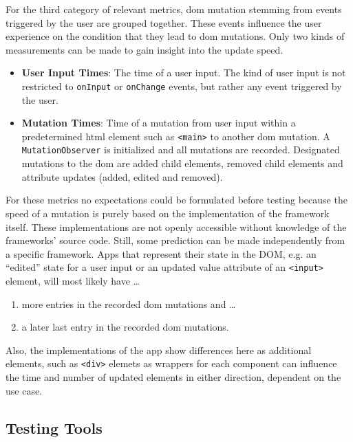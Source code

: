 \documentclass[a4paper, 12pt]{article}
\begin{document}
For the third category of relevant metrics, \acrshort{dom} mutation stemming from events triggered by the user are grouped together.
These events influence the user experience on the condition that they lead to \acrshort{dom} mutations.
Only two kinds of measurements can be made to gain insight into the update speed.

\begin{itemize}
  \item \textbf{User Input Times}: The time of a user input.
  The kind of user input is not restricted to \verb|onInput| or \verb|onChange| events, but rather any event triggered by the user.
  \item \textbf{Mutation Times}: Time of a mutation from user input within a predetermined \acrshort{html} element such as \verb|<main>| to another \acrshort{dom} mutation.
  A \verb|MutationObserver| is initialized and all mutations are recorded. Designated mutations to the \acrshort{dom} are added child elements, removed child elements and attribute updates (added, edited and removed).
\end{itemize}

For these metrics no expectations could be formulated before testing because the speed of a mutation is purely based on the implementation of the framework itself.
These implementations are not openly accessible without knowledge of the frameworks' source code.
Still, some prediction can be made independently from a specific framework.
Apps that represent their state in the DOM, e.g. an \enquote{edited} state for a user input or an updated value attribute of an \verb|<input>| element, will most likely have \dots

\begin{enumerate}
  \item more entries in the recorded \acrshort{dom} mutations and \dots
  \item a later last entry in the recorded \acrshort{dom} mutations.
\end{enumerate}

Also, the implementations of the app show differences here as additional elements, such as \verb|<div>| elemets as wrappers for each component can influence the time and number of updated elements in either direction, dependent on the use case.

\subsection{Testing Tools}\label{subsec:testingtools}
% 
% 
\end{document}
